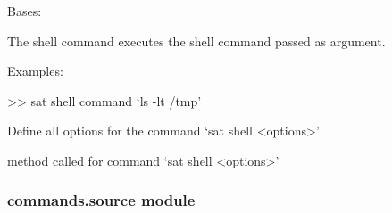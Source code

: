 \documentclass[a4paper,10pt,english]{sphinxmanual}
\begin{document}
\begin{fulllineitems}
\label{\detokenize{apidoc_commands/commands:commands.shell.Command}}
Bases: 

The shell command executes the shell command passed as argument.

\begin{DUlineblock}{0em}
\item[] Examples:
\item[] \textgreater{}\textgreater{} sat shell \textendash{}command ‘ls -lt /tmp’
\end{DUlineblock}

\begin{fulllineitems}
\label{\detokenize{apidoc_commands/commands:commands.shell.Command.getParser}}
Define all options for the command ‘sat shell \textless{}options\textgreater{}’

\end{fulllineitems}


\begin{fulllineitems}
\label{\detokenize{apidoc_commands/commands:commands.shell.Command.name}}
\end{fulllineitems}


\begin{fulllineitems}
\label{\detokenize{apidoc_commands/commands:commands.shell.Command.run}}
method called for command ‘sat shell \textless{}options\textgreater{}’

\end{fulllineitems}


\end{fulllineitems}



\subsubsection{commands.source module}
\label{\detokenize{apidoc_commands/commands:module-commands.source}}\label{\detokenize{apidoc_commands/commands:commands-source-module}}
\end{document}

